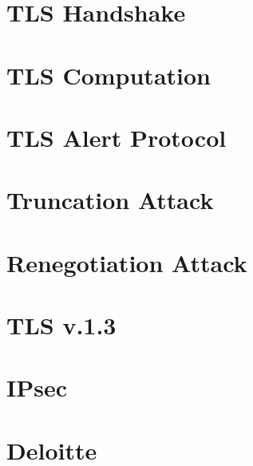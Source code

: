 \documentclass{article}
\begin{document}
\section{TLS Handshake}

\section{TLS Computation}
\section{TLS Alert Protocol}
\section{Truncation Attack}
\section{Renegotiation Attack}


\section{TLS v.1.3}
\section{IPsec}
\section{Deloitte}
\end{document}
